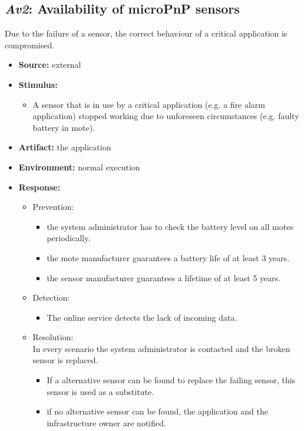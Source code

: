 \subsection{\emph{Av2}: Availability of microPnP sensors}
Due to the failure of a sensor, the correct behaviour of a critical application is compromised.
\begin{itemize}
    \item \textbf{Source:} external
    \item \textbf{Stimulus:}
        \begin{itemize}
            \item A sensor that is in use by a critical application (e.g. a fire alarm application) stopped working due to unforeseen circumstances (e.g. faulty battery in mote).
        \end{itemize}

    \item \textbf{Artifact:} the application
    \item \textbf{Environment:} normal execution
    \item \textbf{Response:}
        \begin{itemize}
            \item Prevention:
            \begin{itemize}
            	\item the system administrator has to check the battery level on all motes periodically.
            	\item the mote manufacturer guarantees a battery life of at least 3 years.
            	\item the sensor manufacturer guarantees a lifetime of at least 5 years.
            \end{itemize}
            \item Detection:
            \begin{itemize}
            	\item The online service detects the lack of incoming data.
            \end{itemize}
            \item Resolution:\\
            In every scenario the system administrator is contacted and the broken sensor is replaced.
            \begin{itemize}
            	\item If a alternative sensor can be found to replace the failing sensor, this sensor is used as a substitute.
            	\item if no alternative sensor can be found, the application and the infrastructure owner are notified.
            \end{itemize}
        \end{itemize}


\end{itemize}
